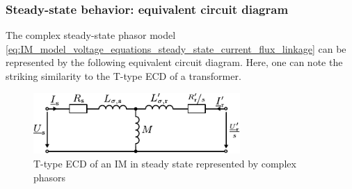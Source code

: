 \begin{frame}
	\frametitle{Steady-state behavior: equivalent circuit diagram} 
    The complex steady-state phasor model \eqref{eq:IM_model_voltage_equations_steady_state_current_flux_linkage} can be represented by the following equivalent circuit diagram. Here, one can note the striking similarity to the T-type ECD of a transformer.
    \begin{figure}
        \centering
        \includegraphics[width=0.7\textwidth]{fig/lec06/IM_T_ECD_steady_state.pdf}
        \caption{T-type ECD of an IM in steady state represented by complex phasors}
        \label{fig:IM_T_ECD_steady_state}
    \end{figure}
\end{frame}

